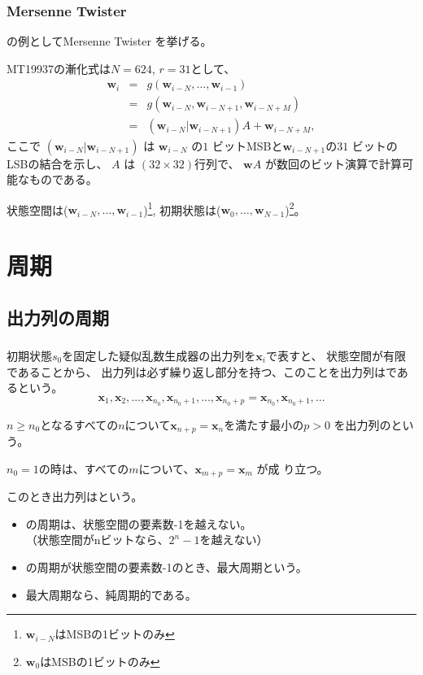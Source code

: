 \documentclass[cjk, dvips, handout, trans, xcolor=dvipsnames]{beamer}
\def\bx{{{\mathbf x}}}
\def\bw{{{\mathbf w}}}
\begin{document}
\begin{frame}[t]
  \frametitle{Mersenne Twister}

  \FLPRNG の例としてMersenne Twister を挙げる。

  MT19937の漸化式は$N = 624$, $r = 31$として、
  \begin{eqnarray*}
    \bw_i &=& g(\bw_{i-N},\ldots,\bw_{i-1}) \\
    &=& g(\bw_{i-N}, \bw_{i-N+1}, \bw_{i-N+M})\\
    &=& (\bw_{i-N}|\bw_{i-N+1})A + \bw_{i-N+M},
  \end{eqnarray*}
  ここで $(\bw_{i-N}|\bw_{i-N+1})$ は
  $\bw_{i-N}$ の$1$ ビットMSBと$\bw_{i-N+1}$の$31$ ビットのLSBの結合を示し、
  $A$ は $(32\times 32)$行列で、
  $\bw A$ が数回のビット演算で計算可能なものである。

  状態空間は($\bw_{i-N},\ldots,\bw_{i-1}$)\footnote{$\bw_{i-N}$はMSBの1ビットのみ},
  初期状態は($\bw_{0},\ldots,\bw_{N-1}$)\footnote{$\bw_{0}$はMSBの1ビットのみ}。
\end{frame}

\section{周期}
\subsection{出力列の周期}
\begin{frame}[t]
  \frametitle{\insertsubsection}
  初期状態$s_0$を固定した疑似乱数生成器の出力列を$\bx_i$で表すと、
  状態空間が有限であることから、
  出力列は必ず繰り返し部分を持つ、このことを出力列はであるという。
  \[
  \bx_1, \bx_2, ..., \bx_{n_0}, \bx_{n_0 + 1}, ..., \bx_{n_0 + p} = \bx_{n_0},
  \bx_{n_0+1}, ...
  \]

  \pause
  $n \ge n_0$となるすべての$n$について$\bx_{n + p} = \bx_{n}$を満たす最小の$p > 0$
  を出力列のという。

  \pause
  $n_0 = 1$の時は、すべての$m$について、$\bx_{m + p} = \bx_m$ が成
  り立つ。

  このとき出力列はという。

  \begin{itemize}
    \item \FLPRNG の周期は、状態空間の要素数-1を越えない。\\
      （状態空間がnビットなら、$2^n-1$を越えない）
    \item \FLPRNG の周期が状態空間の要素数-1のとき、最大周期という。
    \item 最大周期なら、純周期的である。
  \end{itemize}
\end{frame}
\end{document}
